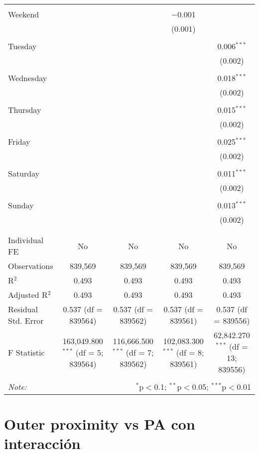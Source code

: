 \documentclass[
]{article}
\begin{document}
\begin{table}[!htbp]
{\begin{tabular}{@{\extracolsep{5pt}}lcccc}
  & & & & \\ 
 Weekend &  &  & $-$0.001 &  \\ 
  &  &  & (0.001) &  \\ 
  & & & & \\ 
 Tuesday &  &  &  & 0.006$^{***}$ \\ 
  &  &  &  & (0.002) \\ 
  & & & & \\ 
 Wednesday &  &  &  & 0.018$^{***}$ \\ 
  &  &  &  & (0.002) \\ 
  & & & & \\ 
 Thursday &  &  &  & 0.015$^{***}$ \\ 
  &  &  &  & (0.002) \\ 
  & & & & \\ 
 Friday &  &  &  & 0.025$^{***}$ \\ 
  &  &  &  & (0.002) \\ 
  & & & & \\ 
 Saturday &  &  &  & 0.011$^{***}$ \\ 
  &  &  &  & (0.002) \\ 
  & & & & \\ 
 Sunday &  &  &  & 0.013$^{***}$ \\ 
  &  &  &  & (0.002) \\ 
  & & & & \\ 
\hline \\[-1.8ex] 
Individual FE & No & No & No & No \\ 
Observations & 839,569 & 839,569 & 839,569 & 839,569 \\ 
R$^{2}$ & 0.493 & 0.493 & 0.493 & 0.493 \\ 
Adjusted R$^{2}$ & 0.493 & 0.493 & 0.493 & 0.493 \\ 
Residual Std. Error & 0.537 (df = 839564) & 0.537 (df = 839562) & 0.537 (df = 839561) & 0.537 (df = 839556) \\ 
F Statistic & 163,049.800$^{***}$ (df = 5; 839564) & 116,666.500$^{***}$ (df = 7; 839562) & 102,083.300$^{***}$ (df = 8; 839561) & 62,842.270$^{***}$ (df = 13; 839556) \\ 
\hline 
\hline \\[-1.8ex] 
\textit{Note:}  & \multicolumn{4}{r}{$^{*}$p$<$0.1; $^{**}$p$<$0.05; $^{***}$p$<$0.01} \\ 
\end{tabular}
} 
\end{table} 
\newpage
\section{Outer proximity vs PA con interacción}
\end{document}
